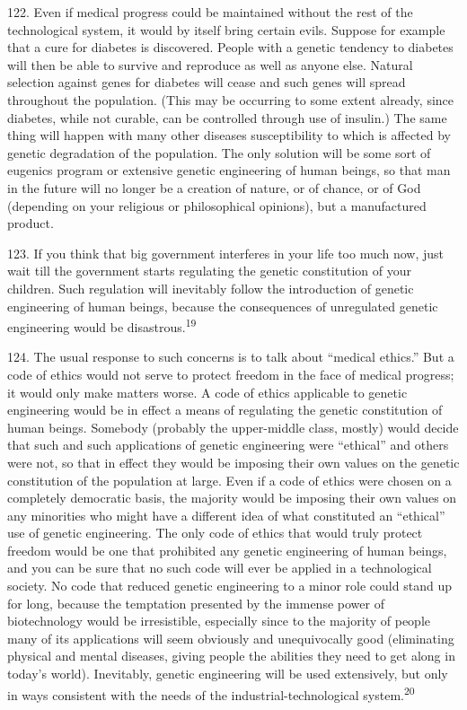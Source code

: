\documentclass{article}
\begin{document}
122. Even if medical progress could be maintained without the rest of the technological system, 
it would by itself bring certain evils. Suppose for example that a cure for diabetes is 
discovered. People with a genetic tendency to diabetes will then be able to survive and reproduce 
as well as anyone else. Natural selection against genes for diabetes will cease and such genes will 
spread throughout the population. (This may be occurring to some extent already, since diabetes, 
while not curable, can be controlled through use of insulin.) The same thing will happen with many 
other diseases susceptibility to which is affected by genetic degradation of the population. The 
only solution will be some sort of eugenics program or extensive genetic engineering of human 
beings, so that man in the future will no longer be a creation of nature, or of chance, or of God 
(depending on your religious or philosophical opinions), but a manufactured product. \vspace{\baselineskip}

123. If you think that big government interferes in your life too much now, just wait till the 
government starts regulating the genetic constitution of your children. Such regulation will 
inevitably follow the introduction of genetic engineering of human beings, because the 
consequences of unregulated genetic engineering would be disastrous.\textsuperscript{19} \vspace{\baselineskip}

124. The usual response to such concerns is to talk about “medical ethics.” But a code of ethics 
would not serve to protect freedom in the face of medical progress; it would only make matters 
worse. A code of ethics applicable to genetic engineering would be in effect a means of regulating 
the genetic constitution of human beings. Somebody (probably the upper-middle class, mostly) 
would decide that such and such applications of genetic engineering were “ethical” and others 
were not, so that in effect they would be imposing their own values on the genetic constitution of 
the population at large. Even if a code of ethics were chosen on a completely democratic basis, 
the majority would be imposing their own values on any minorities who might have a different 
idea of what constituted an “ethical” use of genetic engineering. The only code of ethics that 
would truly protect freedom would be one that prohibited any genetic engineering of human 
beings, and you can be sure that no such code will ever be applied in a technological society. No 
code that reduced genetic engineering to a minor role could stand up for long, because the 
temptation presented by the immense power of biotechnology would be irresistible, especially 
since to the majority of people many of its applications will seem obviously and unequivocally 
good (eliminating physical and mental diseases, giving people the abilities they need to get along 
in today’s world). Inevitably, genetic engineering will be used extensively, but only in ways 
consistent with the needs of the industrial-technological system.\textsuperscript{20}
\end{document}
